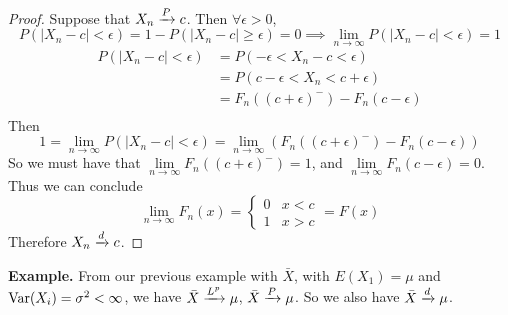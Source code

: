 \documentclass[openany]{report}
\begin{document}
    \begin{proof}
        Suppose that $X_n \xrightarrow{P} c$. Then $\forall \epsilon > 0$,  
        \[P(|X_n - c| < \epsilon) = 1 - P(|X_n - c| \geq \epsilon) = 0 \implies \lim_{n\rightarrow\infty}P(|X_n - c| < \epsilon) = 1\]
        \begin{align*}
            P(|X_n-c| < \epsilon) &= P(- \epsilon < X_n - c < \epsilon)\\
            &= P(c - \epsilon < X_n < c + \epsilon)\\
            &= F_n((c + \epsilon)^-) - F_n(c-\epsilon)\\
        \end{align*}
        Then 
        \[1 = \lim_{n \rightarrow\infty}P(|X_n - c| < \epsilon) = \lim_{n\rightarrow \infty} \left(F_n((c+\epsilon)^-)  - F_n(c-\epsilon)\right)\]
        So we must have that $\lim\limits_{n\rightarrow \infty} F_n((c+\epsilon)^-) = 1$, and $\lim\limits_{n\rightarrow \infty} F_n(c-\epsilon) = 0$. Thus we can conclude
        \[\lim_{n\rightarrow\infty}F_n(x) = \begin{cases}
            0 & x < c\\
            1 & x > c
        \end{cases} = F(x)\]
        Therefore $X_n \xrightarrow{d} c$. 
    \end{proof}
    \textbf{Example.} From our previous example with $\bar{X}$, with $E(X_1) = \mu$ and $\operatorname{Var}(X_i) = \sigma^2 < \infty$, we have $\bar{X} \xrightarrow{L^{p}} \mu$, $\bar{X} \xrightarrow{P} \mu$. So we also have $\bar{X} \xrightarrow{d} \mu$.
\end{document}
